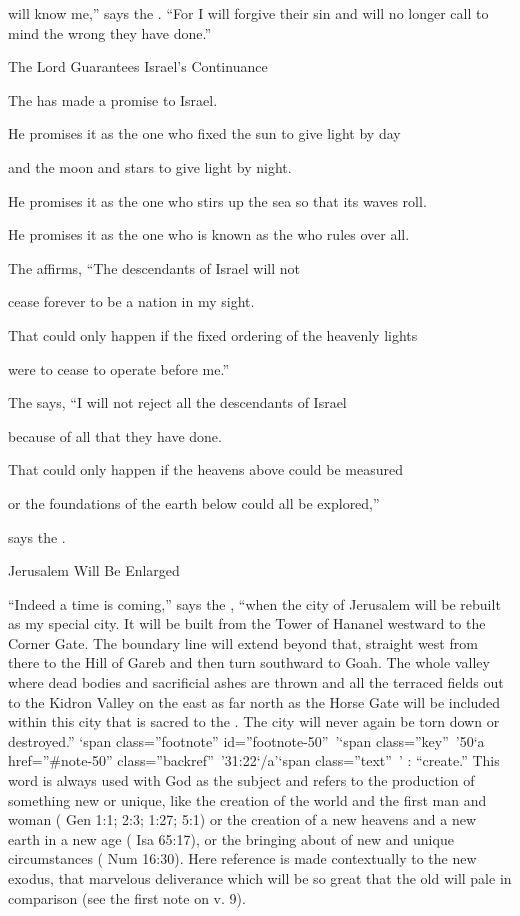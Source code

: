 {will know
me,” says
the {}. “For
I will forgive
their sin
and will no
longer
call to mind
the wrong they have done.”
\par }{\SH The Lord Guarantees Israel’s Continuance
\par }{\Q {}The
{}
has made a promise
to Israel.
\par }{\Q He promises
it as the one who fixed
the sun
to give light
by day
\par }{\Q and the moon
and stars
to give light
by night.
\par }{\Q He promises it as the one who stirs
up the sea
so that its waves
roll.
\par }{\Q He promises it as the one who is known as the
{}
who rules over all.
\par }{\Q {}The
{}
affirms, “The descendants
of Israel
will
not
\par }{\Q cease forever to be a nation in my sight.
\par }{\Q That could only happen if the fixed ordering of the heavenly lights
\par }{\Q were to cease to operate before me.”
\par }{\Q {}The
{}
says,
“I
will not reject
all
the descendants
of Israel
\par }{\Q because
of all
that
they have
done.
\par }{\Q That
could only happen if
the heavens
above
could be measured
\par }{\Q or the foundations
of the earth
below
could
all be explored,”
\par }{\Q says
the {}.
\par }{\SH Jerusalem Will Be Enlarged
\par }{\PP {}“Indeed
a time
is coming,” says
the {}, “when
the city of Jerusalem will be rebuilt
as my special city.
It will be built
from the Tower
of Hananel
westward to the Corner
Gate.
The boundary line
will extend beyond that, straight
west from there
to the Hill
of Gareb
and then turn southward
to Goah.
The whole
valley
where dead bodies
and sacrificial ashes
are thrown and all
the terraced fields
out to the Kidron
Valley
on the east
as
far north as
the Horse
Gate
will be included within this city that is sacred
to the
{}. The city will
never
again
be torn
down or
destroyed.” ‘span class=”footnote” id=”footnote-50” ’‘span class=”key” ’50‘a href=”\#note-50” class=”backref” ’31:22‘/a’‘span class=”text” ’
{}:
{} “create.” This word is always used with God as the subject and refers to the production of something new or unique, like the creation of the world and the first man and woman (
Gen 1:1; 2:3; 1:27; 5:1) or the creation of a new heavens and a new earth in a new age (
Isa 65:17), or the bringing about of new and unique circumstances (
Num 16:30). Here reference is made contextually to the new exodus, that marvelous deliverance which will be so great that the old will pale in comparison (see the first note on v.
9).

}
